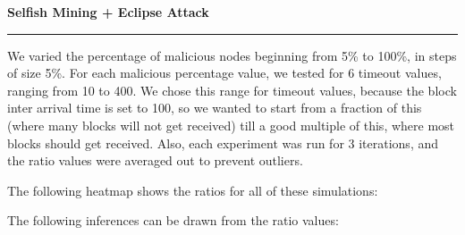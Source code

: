 \documentclass[a4paper,12pt]{article}
\newenvironment{solution}[2][]{%
\begin{mdframed}[linecolor=blue!70!black, linewidth=2pt, roundcorner=10pt, backgroundcolor=yellow!10!white, skipabove=12pt, skipbelow=12pt]%
	\textbf{\large #2}
	\par\noindent\rule{\textwidth}{0.4pt}
}{
\end{mdframed}
}
\begin{document}
\begin{solution}{Selfish Mining + Eclipse Attack}
	We varied the percentage of malicious nodes beginning from 5\% to 100\%, in steps of size 5\%. For each malicious percentage value, we tested for 6 timeout values, ranging from 10 to 400. We chose this range for timeout values, because the block inter arrival time is set to 100, so we wanted to start from a fraction of this (where many blocks will not get received) till a good multiple of this, where most blocks should get received. Also, each experiment was run for 3 iterations, and the ratio values were averaged out to prevent outliers.


	The following heatmap shows the ratios for all of these simulations:

	\begin{figure}[H]
		\centering
	\end{figure}

	The following inferences can be drawn from the ratio values:


\end{solution}
\end{document}
